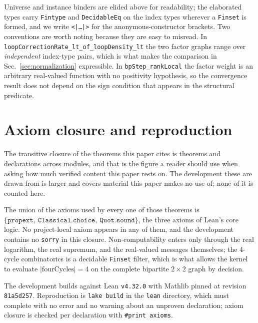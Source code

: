\documentclass[aps,prx,reprint,nofootinbib,floatfix]{revtex4-2}
\begin{document}
Universe and instance binders are elided above for readability; the elaborated
types carry \texttt{Fintype} and \texttt{DecidableEq} on the index types
wherever a \texttt{Finset} is formed, and we write \texttt{<|\dots|>} for the
anonymous-constructor brackets. Two conventions are worth noting because they are
easy to misread. In \texttt{loopCorrectionRate\_lt\_of\_loopDensity\_lt} the
two factor graphs range over \emph{independent} index-type pairs, which is what
makes the comparison in Sec.~\ref{sec:normalization} expressible. In
\texttt{bpStep\_rankLocal} the factor weight is an arbitrary real-valued
function with no positivity hypothesis, so the convergence result does not
depend on the sign condition that appears in the structural predicate.

\section{Axiom closure and reproduction}
\label{app:axioms}

The transitive closure of the theorems this paper cites is \bundleTheorems{}
theorems and \bundleDecls{} declarations across \bundleModules{} modules, and
that is the figure a reader should use when asking how much verified content
this paper rests on. The development these are drawn from is larger and covers
material this paper makes no use of; none of it is counted here.

The union of the axioms used by every one of those theorems is
$\{\mathtt{propext},\ \mathtt{Classical.choice},\ \mathtt{Quot.sound}\}$, the
three axioms of Lean's core logic. No project-local axiom appears in any of
them, and the development contains no \texttt{sorry} in this closure.
Non-computability enters only through the real logarithm, the real supremum,
and the real-valued messages themselves; the 4-cycle combinatorics is a
decidable \texttt{Finset} filter, which is what allows the kernel to evaluate
$|\mathrm{fourCycles}| = 4$ on the complete bipartite $2 \times 2$ graph by
decision.

The development builds against Lean \texttt{v4.32.0} with Mathlib pinned at
revision \texttt{81a5d257}. Reproduction is \texttt{lake build} in the
\texttt{lean} directory, which must complete with no error and no warning about
an unproven declaration; axiom closure is checked per declaration with
\texttt{\#print axioms}.
\end{document}
